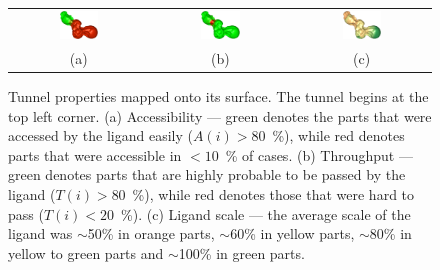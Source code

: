 \documentclass[letterpaper, 10 pt, conference]{ieeeconf} %
\newcommand{\tylde}{$\sim$}
\begin{document}
\begin{figure}[h]
\centering
\begin{tabular}{ccc}
\includegraphics[width=0.3\textwidth]{fig/accessibility} &
\includegraphics[width=0.3\textwidth]{fig/throughput} &
\includegraphics[width=0.3\textwidth]{fig/ligand-scale} \\
  (a) & (b) & (c) \\                     
\end{tabular}
\caption{Tunnel properties mapped onto its surface. The tunnel begins at the top left corner.
(a) Accessibility --- green denotes the parts that were accessed by the ligand easily ($A(i) > 80$~\%), 
    while red denotes parts that were accessible  in $<10$~\% of cases.
(b) Throughput --- green denotes parts that are highly probable to be passed by the ligand ($T(i) > 80$~\%), 
    while red denotes those that were hard to pass ($T(i) < 20$~\%).
(c) Ligand scale --- the average scale of the ligand was \tylde 50\% in orange parts, \tylde 60\% in yellow parts, \tylde 80\% in yellow to green parts and \tylde 100\% in green parts.
\label{fig:properties}
}
\end{figure}



\def\cstart{\overline{c_{start}}}
\def\cend{\overline{c_{end}}}
\end{document}

